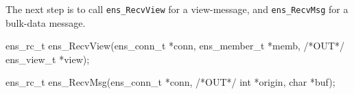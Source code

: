 The next step is to call {\tt ens\_RecvView} for a view-message, and
{\tt ens\_RecvMsg} for a bulk-data message. 

\begin{codebox}
ens_rc_t ens_RecvView(ens_conn_t *conn, 
                      ens_member_t *memb,
                      /*OUT*/ ens_view_t *view);

ens_rc_t ens_RecvMsg(ens_conn_t *conn, 
                     /*OUT*/ int *origin, char *buf);
\end{codebox}















